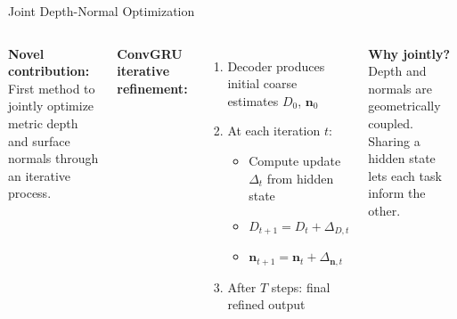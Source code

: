 \begin{frame}{Joint Depth-Normal Optimization}
\begin{columns}[T]
\textbf{Novel contribution:} First method to jointly optimize metric depth and surface normals through an iterative process.

\vspace{0.3cm}
\textbf{ConvGRU iterative refinement:}
\begin{enumerate}
  \item Decoder produces initial coarse estimates $D_0$, $\mathbf{n}_0$
  \item At each iteration $t$:
    \begin{itemize}
      \item Compute update $\Delta_t$ from hidden state
      \item $D_{t+1} = D_t + \Delta_{D,t}$
      \item $\mathbf{n}_{t+1} = \mathbf{n}_t + \Delta_{\mathbf{n},t}$
    \end{itemize}
  \item After $T$ steps: final refined output
\end{enumerate}

\vspace{0.2cm}
\textbf{Why jointly?} Depth and normals are geometrically coupled. Sharing a hidden state lets each task inform the other.

\centering
{}
\end{columns}
\end{frame}
